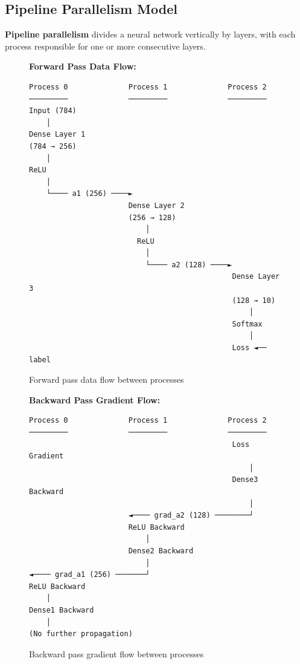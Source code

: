 \documentclass[11pt,a4paper]{article}
\begin{document}
\subsection{Pipeline Parallelism Model}

\textbf{Pipeline parallelism} divides a neural network vertically by layers, with each process responsible for one or more consecutive layers.

\begin{figure}[h]
\centering
\begin{tcolorbox}[colback=green!5,colframe=green!50!black,width=0.95\textwidth]
\textbf{Forward Pass Data Flow:}
\begin{verbatim}
Process 0              Process 1              Process 2
─────────              ─────────              ─────────
Input (784)
    │
Dense Layer 1
(784 → 256)
    │
ReLU
    │
    └──── a1 (256) ────►
                       Dense Layer 2
                       (256 → 128)
                           │
                         ReLU
                           │
                           └──── a2 (128) ────►
                                               Dense Layer 3
                                               (128 → 10)
                                                   │
                                               Softmax
                                                   │
                                               Loss ◄── label
\end{verbatim}
\end{tcolorbox}
\caption{Forward pass data flow between processes}
\end{figure}

\begin{figure}[h]
\centering
\begin{tcolorbox}[colback=red!5,colframe=red!50!black,width=0.95\textwidth]
\textbf{Backward Pass Gradient Flow:}
\begin{verbatim}
Process 0              Process 1              Process 2
─────────              ─────────              ─────────
                                               Loss Gradient
                                                   │
                                               Dense3 Backward
                                                   │
                       ◄──── grad_a2 (128) ────────┘
                       ReLU Backward
                           │
                       Dense2 Backward
                           │
◄──── grad_a1 (256) ───────┘
ReLU Backward
    │
Dense1 Backward
    │
(No further propagation)
\end{verbatim}
\end{tcolorbox}
\caption{Backward pass gradient flow between processes}
\end{figure}
\end{document}
